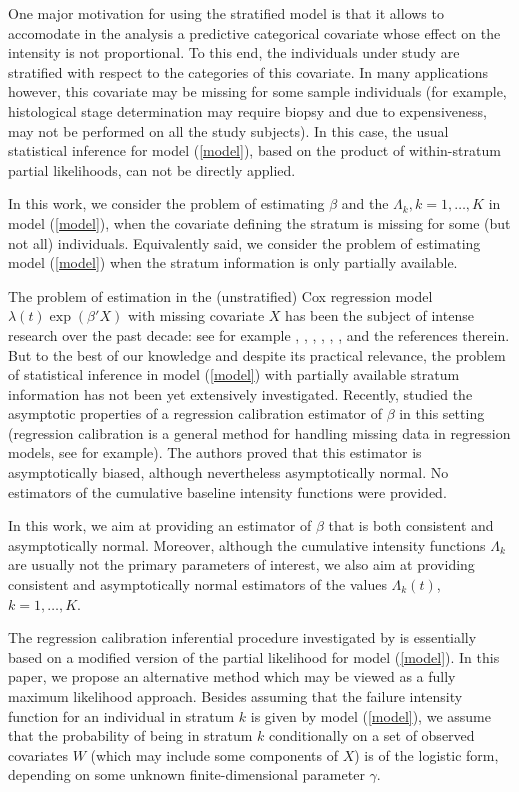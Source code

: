 \documentclass{statsoc}
\begin{document}
One major motivation for using the stratified model is that it allows to accomodate in the analysis a predictive categorical covariate whose effect on the intensity is not proportional. To this end, the individuals under study are stratified with respect to the categories of this covariate. In many applications however, this covariate may be missing for some sample individuals (for example, histological stage determination may require biopsy and due to expensiveness, may not be performed on all the study subjects). In this case, the usual statistical inference for model (\ref{model}), based on the product of within-stratum partial likelihoods, can not be directly applied.

In this work, we consider the problem of estimating $\beta$ and the $\Lambda_k, k=1,\ldots,K$ in model (\ref{model}), when the covariate defining the stratum is missing for some (but not all) individuals.  Equivalently said, we consider the problem of estimating model (\ref{model}) when the stratum information is only partially available.

The problem of estimation in the (unstratified) Cox regression model $\lambda(t)\exp(\beta'X)$ with missing covariate $X$ has been the subject of intense research over the past decade: see for example \cite{lin93}, \cite{paiklida}, \cite{paik97}, \cite{chen99}, \cite{mart99}, \cite{pons02}, and the references therein. But to the best of our knowledge and despite its practical relevance, the problem of statistical inference in model (\ref{model}) with partially available stratum information has not been yet extensively investigated. Recently, \cite{duplec} studied the asymptotic properties of a regression calibration estimator of $\beta$ in this setting (regression calibration is a general method for handling missing data in regression models, see \cite{crs} for example). The authors proved that this estimator is asymptotically biased, although nevertheless asymptotically normal. No estimators of the cumulative baseline intensity functions were provided.

In this work, we aim at providing an estimator of $\beta$ that is both consistent and asymptotically normal. Moreover, although the cumulative intensity functions $\Lambda_k$ are usually not the primary parameters of interest, we also aim at providing consistent and asymptotically normal estimators of the values $\Lambda_k(t)$, $k=1,\ldots,K$.

The regression calibration inferential procedure investigated by \cite{duplec} is essentially based on a modified version of the partial likelihood for model (\ref{model}). In this paper, we propose an alternative method which may be viewed as a fully maximum likelihood approach. Besides assuming that the failure intensity function for an individual in stratum $k$ is given by model (\ref{model}), we assume that the probability of being in stratum $k$ conditionally on a set of observed covariates $W$ (which may include some components of $X$) is of the logistic form, depending on some unknown finite-dimensional parameter $\gamma$. 
\end{document}

